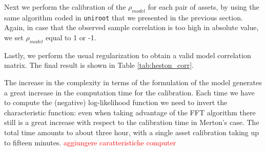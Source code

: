 Next we perform the calibration of the  $\rho_{model}$ for each pair of assets, by using the same algorithm coded in \texttt{uniroot} that we presented  in the  previous section. Again, in case that the observed sample correlation is too high in absolute value, we set $\rho_{model}$ equal to 1 or -1.

Lastly, we perform the usual regularization to obtain a valid model correlation matrix.
The final result is shown in Table \ref{tab:heston_corr}.

\bigskip
The increase in the complexity in terms of the formulation of the model generates a great increase in the computation time for the calibration. Each time we have to compute the (negative) log-likelihood function we need to invert the characteristic function: even when taking advantage of the FFT algorithm there still is a great increase with respect to the calibration time in Merton's case. The total time amounts to about three hour, with a single asset calibration taking up to fifteen minutes. \textcolor{red}{aggiungere caratteristiche computer}

